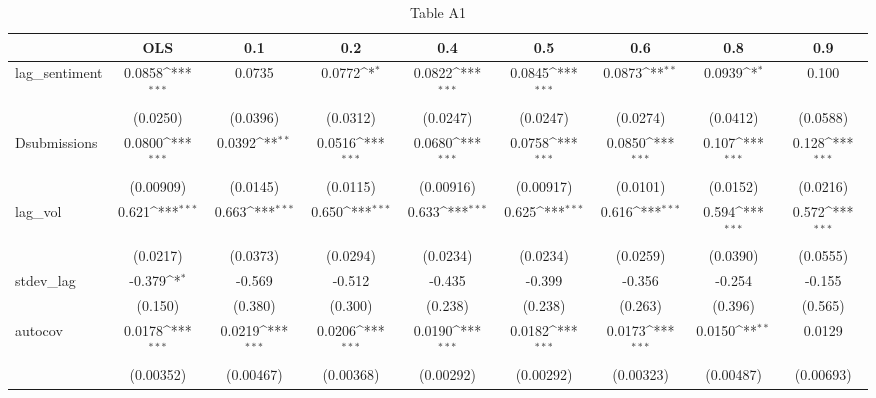 \begin{table}[htbp]\centering
\def\sym#1{\ifmmode^{#1}\else\(^{#1}\)\fi}
\caption{Table A1}
\begin{tabular}{l*{8}{c}}
\hline\hline
                &\multicolumn{1}{c}{OLS}&\multicolumn{1}{c}{0.1}&\multicolumn{1}{c}{0.2}&\multicolumn{1}{c}{0.4}&\multicolumn{1}{c}{0.5}&\multicolumn{1}{c}{0.6}&\multicolumn{1}{c}{0.8}&\multicolumn{1}{c}{0.9}\\
\hline
lag\_sentiment   &   0.0858\sym{***}&   0.0735         &   0.0772\sym{*}  &   0.0822\sym{***}&   0.0845\sym{***}&   0.0873\sym{**} &   0.0939\sym{*}  &    0.100         \\
                & (0.0250)         & (0.0396)         & (0.0312)         & (0.0247)         & (0.0247)         & (0.0274)         & (0.0412)         & (0.0588)         \\
[1em]
Dsubmissions    &   0.0800\sym{***}&   0.0392\sym{**} &   0.0516\sym{***}&   0.0680\sym{***}&   0.0758\sym{***}&   0.0850\sym{***}&    0.107\sym{***}&    0.128\sym{***}\\
                &(0.00909)         & (0.0145)         & (0.0115)         &(0.00916)         &(0.00917)         & (0.0101)         & (0.0152)         & (0.0216)         \\
[1em]
lag\_vol         &    0.621\sym{***}&    0.663\sym{***}&    0.650\sym{***}&    0.633\sym{***}&    0.625\sym{***}&    0.616\sym{***}&    0.594\sym{***}&    0.572\sym{***}\\
                & (0.0217)         & (0.0373)         & (0.0294)         & (0.0234)         & (0.0234)         & (0.0259)         & (0.0390)         & (0.0555)         \\
[1em]
stdev\_lag       &   -0.379\sym{*}  &   -0.569         &   -0.512         &   -0.435         &   -0.399         &   -0.356         &   -0.254         &   -0.155         \\
                &  (0.150)         &  (0.380)         &  (0.300)         &  (0.238)         &  (0.238)         &  (0.263)         &  (0.396)         &  (0.565)         \\
[1em]
autocov         &   0.0178\sym{***}&   0.0219\sym{***}&   0.0206\sym{***}&   0.0190\sym{***}&   0.0182\sym{***}&   0.0173\sym{***}&   0.0150\sym{**} &   0.0129         \\
                &(0.00352)         &(0.00467)         &(0.00368)         &(0.00292)         &(0.00292)         &(0.00323)         &(0.00487)         &(0.00693)         \\

\end{tabular}
\end{table}
